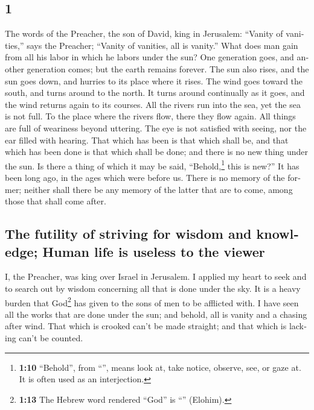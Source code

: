 \begin{paracol}{2}
\begin{otherlanguage}{english}
\hypertarget{section-1}{%
\section{1}\label{section-1}}

 The words of the Preacher, the son of David, king in
Jerusalem:  ``Vanity of vanities,'' says the Preacher;
``Vanity of vanities, all is vanity.''  What does man gain
from all his labor in which he labors under the sun?  One
generation goes, and another generation comes; but the earth remains
forever.  The sun also rises, and the sun goes down, and
hurries to its place where it rises.  The wind goes toward
the south, and turns around to the north. It turns around continually as
it goes, and the wind returns again to its courses.  All
the rivers run into the sea, yet the sea is not full. To the place where
the rivers flow, there they flow again.  All things are
full of weariness beyond uttering. The eye is not satisfied with seeing,
nor the ear filled with hearing.  That which has been is
that which shall be, and that which has been done is that which shall be
done; and there is no new thing under the sun.  Is there
a thing of which it may be said, ``Behold,\footnote{\textbf{1:10}
  ``Behold'', from ``'', means look at, take notice,
  observe, see, or gaze at. It is often used as an interjection.} this
is new?'' It has been long ago, in the ages which were before us.
 There is no memory of the former; neither shall there be
any memory of the latter that are to come, among those that shall come
after.

\hypertarget{the-futility-of-striving-for-wisdom-and-knowledge-human-life-is-useless-to-the-viewer}{%
\subsection{The futility of striving for wisdom and knowledge; Human
life is useless to the
viewer}\label{the-futility-of-striving-for-wisdom-and-knowledge-human-life-is-useless-to-the-viewer}}

 I, the Preacher, was king over Israel in Jerusalem.
 I applied my heart to seek and to search out by wisdom
concerning all that is done under the sky. It is a heavy burden that
God\footnote{\textbf{1:13} The Hebrew word rendered ``God'' is
  ``'' (Elohim).} has given to the sons of men to be
afflicted with.  I have seen all the works that are done
under the sun; and behold, all is vanity and a chasing after wind.
 That which is crooked can't be made straight; and that
which is lacking can't be counted.


\end{otherlanguage}
\end{paracol}
